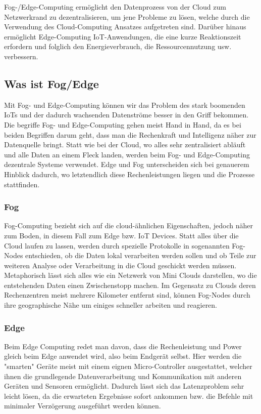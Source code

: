 \documentclass[10pt, a4paper, twocolumn]{article}
\begin{document}
Fog-/Edge-Computing ermöglicht den Datenprozess von der Cloud zum Netzwerkrand zu dezentralisieren, um jene Probleme zu lösen, welche durch die Verwendung des Cloud-Computing Ansatzes aufgetreten sind. Darüber hinaus ermöglicht Edge-Computing IoT-Anwendungen, die eine kurze Reaktionszeit erfordern und folglich den Energieverbrauch, die Ressourcennutzung usw. verbessern.

\subsection{Was ist Fog/Edge}
Mit Fog- und Edge-Computing können wir das Problem des stark boomenden IoTs und der dadurch wachsenden Datenströme besser in den Griff bekommen. 
Die begriffe Fog- und Edge-Computing gehen meist Hand in Hand, da es bei beiden Begriffen darum geht, dass man die Rechenkraft und Intelligenz näher zur Datenquelle bringt. Statt wie bei der Cloud, wo alles sehr zentralisiert abläuft und alle Daten an einem Fleck landen, werden beim Fog- und Edge-Computing dezentrale Systeme verwendet. Edge und Fog unterscheiden sich bei genauerem Hinblick dadurch, wo letztendlich diese Rechenleistungen liegen und die Prozesse stattfinden. 

\subsubsection{Fog}
Fog-Computing bezieht sich auf die cloud-ähnlichen Eigenschaften, jedoch näher zum Boden, in diesem Fall zum Edge bzw. IoT Devices. 
Statt alles über die Cloud laufen zu lassen, werden durch spezielle Protokolle in sogenannten Fog-Nodes entschieden, ob die Daten lokal verarbeiten werden sollen und ob Teile zur weiteren Analyse oder Verarbeitung in die Cloud geschickt werden müssen. Metaphorisch lässt sich alles wie ein Netzwerk von Mini Clouds darstellen, wo die entstehenden Daten einen Zwischenstopp machen. Im Gegensatz zu Clouds deren Rechenzentren meist mehrere Kilometer entfernt sind, können Fog-Nodes durch ihre geographische Nähe um einiges schneller arbeiten und reagieren.

\subsubsection{Edge}
Beim Edge Computing redet man davon, dass die Rechenleistung und Power gleich beim Edge anwendet wird, also beim Endgerät selbst. Hier werden die "smarten" Geräte meist mit einem eignen Micro-Controller ausgestattet, welcher ihnen die grundlegende Datenverarbeitung und Kommunikation mit anderen Geräten und Sensoren ermöglicht. Dadurch lässt sich das Latenzproblem sehr leicht lösen, da die erwarteten Ergebnisse sofort ankommen bzw. die Befehle mit minimaler Verzögerung ausgeführt werden können.
\end{document}
